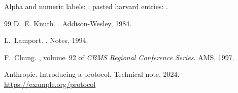 \documentclass[a4paper]{article}%
\begin{document}

Alpha and numeric labels: \cite{chu1997,web2024}; pasted harvard entries:
\cite{armagan2013,bai2020}.
\begin{thebibliography}{99}
\providecommand{\noopsort}[1]{}
 D.~E. Knuth.
.
\newblock Addison-Wesley, 1984.

 L.~Lamport.
.
 Notes, 1994.

 F.~Chung.
, volume~92 of {\em CBMS Regional
  Conference Series}.
\newblock AMS, 1997.

 Anthropic. Introducing a protocol. Technical note, 2024.
\url{https://example.org/protocol}

\end{thebibliography}
\end{document}
